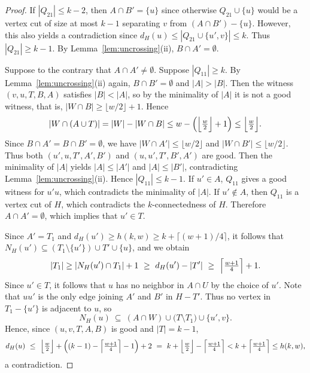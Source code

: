 \documentclass[10pt,a4paper]{amsart}
\begin{document}
\begin{proof}
If $|Q_{21}|\le k-2$, then $A\cap B'=\{u\}$ since  otherwise $Q_{21}\cup\{u\}$ would be a vertex cut of size at most $k-1$ 
separating $v$ from $(A\cap B') -\{u\}$. However, this also yields a contradiction since $d_H(u)\le |Q_{21}\cup\{u',v\}|\le k$.
Thus $|Q_{21}|\ge k-1$.
By Lemma~\ref{lem:uncrossing}(ii), $B\cap A'=\emptyset$.

Suppose to the contrary that $A\cap A'\neq \emptyset$. Suppose $|Q_{11}|\ge k$.
By Lemma~\ref{lem:uncrossing}(ii) again, $B\cap B'=\emptyset$ and $|A|>|B|$.
Then the witness $(v,u,T,B,A)$ satisfies $|B|<|A|$, so by the minimality of $|A|$ it is not a good witness, that is, $|W\cap B|\ge\lfloor w/2\rfloor+1$. Hence
\[
   |W\cap(A\cup T)|=|W|-|W\cap B|
   \le w-\Bigl(\Bigl\lfloor\tfrac w2\Bigr\rfloor+1\Bigr)
   \le \Bigl\lfloor\tfrac w2\Bigr\rfloor .
\]
Since $B\cap A'=B\cap B'=\emptyset$, we have $|W\cap A'|\le\lfloor w/2\rfloor$ and $|W\cap B'|\le\lfloor w/2\rfloor$. 
Thus both $(u',u,T',A',B')$ and $(u,u',T',B',A')$ are good.
Then the minimality of $|A|$ yields $|A|\le|A'|$ and $|A|\le|B'|$, contradicting Lemma~\ref{lem:uncrossing}(ii).
Hence $|Q_{11}|\le k-1$.
If $u'\in A$, $Q_{11}$ gives a good witness for $u'u$, which contradicts the minimality of $|A|$. 
If $u' \not\in A$, then $Q_{11}$ is a vertex cut of $H$, which contradicts the $k$-connectedness of $H$.
Therefore $A\cap A'=\emptyset$, which implies that $u' \in T$.

Since $A'=T_1$ and $d_H(u')\ge h(k,w)\ge k+\lceil (w+1)/4\rceil$, 
it follows that $N_H(u')\subseteq (T_1\setminus\{u'\})\cup T'\cup\{u\}$, and we obtain 
\[
   |T_1|\ge |N_H(u')\cap T_1|+1\ \ge\ d_H(u')-|T'|\ \ge\ \Bigl\lceil \tfrac{w+1}{4}\Bigr\rceil+1.
\]
Since $u' \in T$, it follows that $u$ has no neighbor in $A\cap U$ by the choice of $u'$.
Note that $uu'$ is the only edge joining $A'$ and $B'$ in $H-T'$.
Thus no vertex in $T_1-\{u'\}$ is adjacent to $u$, so 
\[
   N_H(u)\ \subseteq\ (A\cap W) \cup \bigl(T\setminus T_1 \bigr) \cup \{u', v\} .
\]
Hence, since $(u,v,T,A,B)$ is good and $|T|=k-1$,
\[
   d_H(u)\ \le\ \Bigl\lfloor\tfrac w2\Bigr\rfloor
              +\Bigl((k-1)-\Bigl\lceil \tfrac{w+1}{4}\Bigr\rceil-1 \Bigr)+2
          \ =\ k+\Bigl\lfloor\tfrac w2\Bigr\rfloor-\Bigl\lceil \tfrac{w+1}{4}\Bigr\rceil < k+\Bigl\lceil \tfrac{w+1}{4}\Bigr\rceil \le h(k,w),
\]
a contradiction. 
\end{proof}
\end{document}
